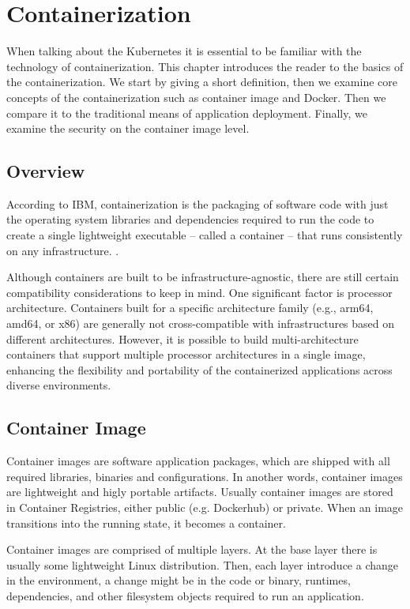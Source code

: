 \section{Containerization}

When talking about the Kubernetes it is essential to be familiar with the technology of containerization. This chapter introduces the reader to the basics of the containerization. We start by giving a short definition, then we examine core concepts of the containerization such as container image and Docker. Then we compare it to the traditional means of application deployment. Finally, we examine the security on the container image level.

\subsection{Overview}

According to IBM, containerization is the packaging of software code with just the operating system libraries and dependencies required to run the code to create a single lightweight executable -- called a container -- that runs consistently on any infrastructure. \cite{ibm-containerization}.

Although containers are built to be infrastructure-agnostic, there are still certain compatibility considerations to keep in mind. One significant factor is processor architecture. Containers built for a specific architecture family (e.g., arm64, amd64, or x86) are generally not cross-compatible with infrastructures based on different architectures. However, it is possible to build multi-architecture containers that support multiple processor architectures in a single image, enhancing the flexibility and portability of the containerized applications across diverse environments.

\subsection{Container Image}

Container images are software application packages, which are shipped with all required libraries, binaries and configurations. In another words, container images are lightweight and higly portable artifacts. Usually container images are stored in Container Registries, either public (e.g. Dockerhub) or private. When an image transitions into the running state, it becomes a container.

Container images are comprised of multiple layers. At the base layer there is usually some lightweight Linux distribution. Then, each layer introduce a change in the environment, a change might be in the code or binary, runtimes, dependencies, and other filesystem objects required to run an application.

